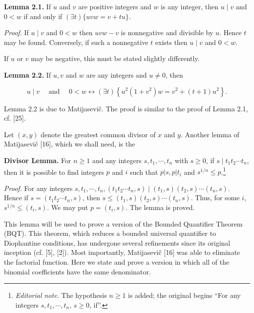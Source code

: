 \documentclass[11pt,a4paper]{article}
\newcommand{\ednote}[1]{\footnote{\textit{Editorial note.} #1}}
\begin{document}
\par{}\medskip\noindent\textbf{Lemma 2.1.} If $u$ and $v$ are positive integers and $w$ is any integer, then $u \mid v$ and $0<w$ if and only if $(\exists t)\{u v w=v+t u\}$.

\noindent\textit{Proof.} If $u \mid v$ and $0<w$ then $u v w-v$ is nonnegative and divisible by $u$. Hence $t$ may be found. Conversely, if such a nonnegative $t$ exists then $u \mid v$ and $0<w$.

If $u$ or $v$ may be negative, this must be stated slightly differently.

\par{}\medskip\noindent\textbf{Lemma 2.2.} If $u, v$ and $w$ are any integers and $u \neq 0$, then

$$
u \mid v \quad \text { and } \quad 0<w \leftrightarrow(\exists t)\left\{u^{2}\left(1+v^{2}\right) w=v^{2}+(t+1) u^{2}\right\} .
$$

Lemma 2.2 is due to Matijasevič. The proof is similar to the proof of Lemma 2.1, cf. [25].

Let $(x, y)$ denote the greatest common divisor of $x$ and $y$. Another lemma of Matijasevič [16], which we shall need, is the

\par\medskip\noindent\textbf{Divisor Lemma.} For $n\geq1$ and any integers $s, t_{1}, \cdots, t_{n}$ with $s \geq 0$, if $s \mid t_{1} t_{2} \cdots t_{n}$, then it is possible to find integers $p$ and $i$ such that $p|s, p| t_{i}$ and $s^{1 / n} \leq p$.\ednote{The hypothesis $n\geq1$ is added; the original begins ``For any integers $s,t_1,\cdots,t_n$, $s\geq0$, if''.}

\noindent\textit{Proof.} For any integers $s, t_{1}, \cdots, t_{n},\left(t_{1} t_{2} \cdots t_{n}, s\right) \mid\left(t_{1}, s\right)\left(t_{2}, s\right) \cdots\left(t_{n}, s\right)$. Hence if $s=\left(t_{1} t_{2} \cdots t_{n}, s\right)$, then $s \leq\left(t_{1}, s\right)\left(t_{2}, s\right) \cdots\left(t_{n}, s\right)$. Thus, for some $i$, $s^{1 / n} \leq\left(t_{i}, s\right)$. We may put $p=\left(t_{i}, s\right)$. The lemma is proved.

This lemma will be used to prove a version of the Bounded Quantifier Theorem (BQT). This theorem, which reduces a bounded universal quantifier to Diophantine conditions, has undergone several refinements since its original inception (cf. [5], [2]). Most importantly, Matijasevič [16] was able to eliminate the factorial function. Here we state and prove a version in which all of the binomial coefficients have the same denominator.
\end{document}
